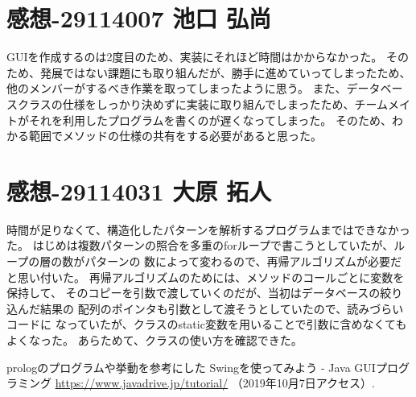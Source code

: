 \documentclass{jarticle}
\begin{document}
\section{感想-29114007 池口 弘尚}
GUIを作成するのは2度目のため、実装にそれほど時間はかからなかった。
そのため、発展ではない課題にも取り組んだが、勝手に進めていってしまったため、他のメンバーがするべき作業を取ってしまったように思う。
また、データベースクラスの仕様をしっかり決めずに実装に取り組んでしまったため、チームメイトがそれを利用したプログラムを書くのが遅くなってしまった。
そのため、わかる範囲でメソッドの仕様の共有をする必要があると思った。
\section{感想-29114031 大原 拓人}
時間が足りなくて、構造化したパターンを解析するプログラムまではできなかった。
はじめは複数パターンの照合を多重のforループで書こうとしていたが、ループの層の数がパターンの
数によって変わるので、再帰アルゴリズムが必要だと思い付いた。
再帰アルゴリズムのためには、メソッドのコールごとに変数を保持して、
そのコピーを引数で渡していくのだが、当初はデータベースの絞り込んだ結果の
配列のポインタも引数として渡そうとしていたので、読みづらいコードに
なっていたが、クラスのstatic変数を用いることで引数に含めなくてもよくなった。
あらためて、クラスの使い方を確認できた。


\begin{thebibliography}{99}
	 prologのプログラムや挙動を参考にした
	 Swingを使ってみよう - Java GUIプログラミング
	\url{https://www.javadrive.jp/tutorial/} （2019年10月7日アクセス）.
\end{thebibliography}
\end{document}

